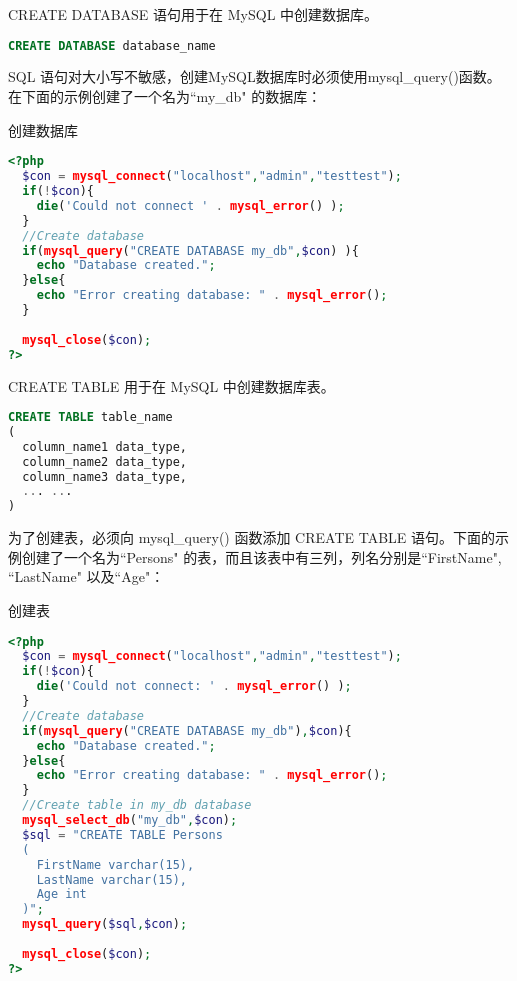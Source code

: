 CREATE DATABASE 语句用于在 MySQL 中创建数据库。

\begin{lstlisting}[language=SQL]
CREATE DATABASE database_name
\end{lstlisting}



SQL 语句对大小写不敏感，创建MySQL数据库时必须使用mysql\_query()函数。在下面的示例创建了一个名为``my\_db" 的数据库：

\begin{example}
创建数据库
\begin{lstlisting}[language=PHP]
<?php
  $con = mysql_connect("localhost","admin","testtest");
  if(!$con){
    die('Could not connect ' . mysql_error() );
  }
  //Create database
  if(mysql_query("CREATE DATABASE my_db",$con) ){
    echo "Database created.";
  }else{
    echo "Error creating database: " . mysql_error();
  }
  
  mysql_close($con);
?>
\end{lstlisting}
\end{example}

CREATE TABLE 用于在 MySQL 中创建数据库表。

\begin{lstlisting}[language=SQL]
CREATE TABLE table_name
(
  column_name1 data_type,
  column_name2 data_type,
  column_name3 data_type,
  ... ...
)
\end{lstlisting}

为了创建表，必须向 mysql\_query() 函数添加 CREATE TABLE 语句。下面的示例创建了一个名为``Persons" 的表，而且该表中有三列，列名分别是``FirstName", ``LastName" 以及``Age"：




\begin{example}
创建表
\begin{lstlisting}[language=PHP]
<?php
  $con = mysql_connect("localhost","admin","testtest");
  if(!$con){
    die('Could not connect: ' . mysql_error() );
  }
  //Create database
  if(mysql_query("CREATE DATABASE my_db"),$con){
    echo "Database created.";
  }else{
    echo "Error creating database: " . mysql_error();
  }
  //Create table in my_db database
  mysql_select_db("my_db",$con);
  $sql = "CREATE TABLE Persons
  (
    FirstName varchar(15),
    LastName varchar(15),
    Age int
  )";
  mysql_query($sql,$con);
  
  mysql_close($con);
?>
\end{lstlisting}
\end{example}


